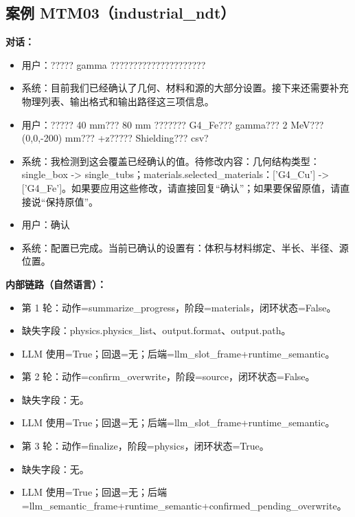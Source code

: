 \documentclass[11pt]{ctexart}
\begin{document}
\subsection{案例 MTM03（industrial\_ndt）}
\textbf{对话：}
\begin{itemize}
\item 用户：????? gamma ?????????????????????
\item 系统：目前我们已经确认了几何、材料和源的大部分设置。接下来还需要补充物理列表、输出格式和输出路径这三项信息。
\item 用户：????? 40 mm??? 80 mm ??????? G4\_Fe??? gamma??? 2 MeV??? (0,0,-200) mm??? +z????? Shielding??? csv?
\item 系统：我检测到这会覆盖已经确认的值。待修改内容：几何结构类型：single\_box -> single\_tubs；materials.selected\_materials：['G4\_Cu'] -> ['G4\_Fe']。如果要应用这些修改，请直接回复“确认”；如果要保留原值，请直接说“保持原值”。
\item 用户：确认
\item 系统：配置已完成。当前已确认的设置有：体积与材料绑定、半长、半径、源位置。
\end{itemize}
\textbf{内部链路（自然语言）：}
\begin{itemize}
\item 第 1 轮：动作=summarize\_progress，阶段=materials，闭环状态=False。
\item 缺失字段：physics.physics\_list、output.format、output.path。
\item LLM 使用=True；回退=无；后端=llm\_slot\_frame+runtime\_semantic。
\item 第 2 轮：动作=confirm\_overwrite，阶段=source，闭环状态=False。
\item 缺失字段：无。
\item LLM 使用=True；回退=无；后端=llm\_slot\_frame+runtime\_semantic。
\item 第 3 轮：动作=finalize，阶段=physics，闭环状态=True。
\item 缺失字段：无。
\item LLM 使用=True；回退=无；后端=llm\_semantic\_frame+runtime\_semantic+confirmed\_pending\_overwrite。
\end{itemize}
\end{document}

